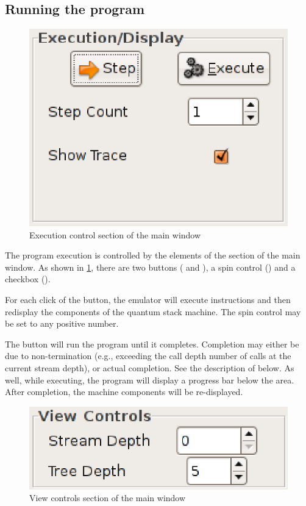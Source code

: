 \subsection{Running the program}

\begin{figure}[htbp]
\centering
\includegraphics[scale=.8]{images/emulator/ExecutionDisplay.eps}
\caption{Execution control section of the main window}\label{fig:emexecdisplay}
\end{figure}

The program execution is controlled by the elements of the
 section of the main window. As shown in
\ref{fig:emexecdisplay}, there are two buttons ( and
), a spin control () and a
checkbox ().

For each click of the  button, the emulator will execute
\emph{} instructions and then redisplay the
components of the quantum stack machine. The spin control may be set to
any positive number.

The  button will run the program until it completes.
Completion may either be due to non-termination (e.g., exceeding the call
depth number of calls at the current stream depth), or actual completion.
See the  description of  below.
As well, while executing, the program will display a progress bar below the
 area.  After completion, the machine components will
be re-displayed.

\begin{figure}[htbp]
\centering
\includegraphics[scale=.8]{images/emulator/ViewControls.eps}
\caption{View controls section of the main window}\label{fig:emviewcontrols}
\end{figure}

